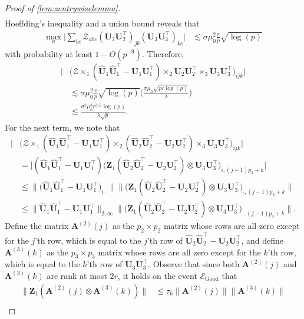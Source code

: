 \documentclass[10pt]{article}
\newcommand{\0}{{\mathbf{0}}}
\newcommand{\1}{{\mathbf{1}}}
\newcommand{\U}{{\mathbf{U}}}
\renewcommand{\t}{^{\top}}
\newcommand{\uhat}{\mathbf{\hat{U}}}
\renewcommand{\hat}{\widehat}
\renewcommand{\hat}{\widehat}
\begin{document}
\begin{proof}[Proof of \cref{lem:zentrywiselemma}]
\begin{align*}
\end{align*}
Hoeffding's inequality and a union bound reveals that
\begin{align*}
    \max_a \bigg| \sum_{bc} \mathcal{Z}_{abc}(\U_2 \U_2\t)_{jb} (\U_3 \U_3\t)_{kc} \bigg| &\lesssim \sigma \mu_0^2 \frac{r}{p} \sqrt{\log(p)}
\end{align*}
with probability at least $1 - O(p^{-9})$.  Therefore,
\begin{align*}
      \bigg| &\bigg( \mathcal{Z} \times_1 (\uhat_1 \uhat_1\t - \U_1 \U_1\t) \times_2  \U_2 \U_2\t\times_3 \U_3 \U_3\t \bigg)_{ijk} \bigg| \\
      &\lesssim \sigma \mu_0^2 \frac{r}{p} \sqrt{\log(p)} \bigg(\frac{\sigma \mu_0 \sqrt{pr\log(p)}}{\lambda} \bigg) \\
      &\lesssim \frac{\sigma^2 \mu_0^3 r^{3/2} \log(p)}{\lambda \sqrt{p}}.
\end{align*}
For the next term, we note that
\begin{align*}
    \bigg| &\bigg( \mathcal{Z} \times_1 (\uhat_1 \uhat_1\t - \U_1 \U_1\t) \times_2 (\uhat_2 \uhat_2\t - \U_2 \U_2\t) \times_3 \U_3 \U_3\t \bigg)_{ijk} \bigg| \\
    &=  \bigg| (\uhat_1 \uhat_1\t - \U_1\U_1\t) \bigg(\mathbf{Z}_1 ( \uhat_2 \uhat_2\t - \U_2\U_2\t) \otimes \U_3 \U_3\t \bigg) _{i, (j-1)p_3 + k}\bigg| \\
    &\leq \| \big(\uhat_1 \uhat_1\t - \U_1\U_1\t \big)_{i\cdot}\| \big\| \bigg(\mathbf{Z}_1 ( \uhat_2 \uhat_2\t - \U_2\U_2\t) \otimes \U_3 \U_3\t\bigg)_{\cdot, (j-1)p_3 + k} \big\| \\
    &\leq \| \uhat_1 \uhat_1\t - \U_1\U_1\t \|_{2,\infty} \big\| \bigg(\mathbf{Z}_1 ( \uhat_2 \uhat_2\t - \U_2\U_2\t) \otimes \U_3 \U_3\t\bigg)_{\cdot, (j-1)p_3 + k} \big\|.
\end{align*}
Define the matrix $\mathbf{A}^{(2)}(j)$ as the $p_2 \times p_2$ matrix whose rows are all zero except for the $j$'th row, which is equal to the $j$'th row of $\uhat_2 \uhat_2\t - \U_2 \U_2\t$, and define $\mathbf{A}^{(3)}(k)$ as the $p_3 \times p_3$ matrix whose rows are all zero except for the $k$'th row, which is equal to the $k$'th row of $\U_3 \U_3\t$.  Observe that since both $\mathbf{A}^{(2)}(j)$ and $\mathbf{A}^{(3)}(k)$ are rank at most $2r$, it holds on the event $\mathcal{E}_{\mathrm{Good}}$ that
\begin{align*}
    \| \mathbf{Z}_1 (\mathbf{A}^{(2)}(j) \otimes \mathbf{A}^{(3)}(k)) \| &\leq \tau_k \|\mathbf{A}^{(2)}(j) \| \|\mathbf{A}^{(3)}(k)\| \\

\end{align*}
\end{proof}
\end{document}
